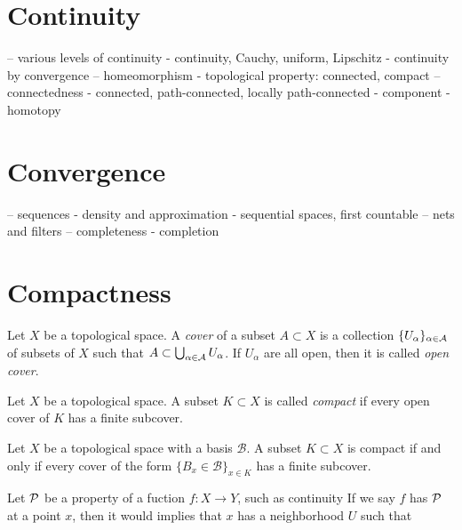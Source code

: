 \documentclass{../crs}
\begin{document}
\chapter{Continuity}
-- various levels of continuity
- continuity, Cauchy, uniform, Lipschitz
- continuity by convergence
-- homeomorphism
- topological property: connected, compact
-- connectedness
- connected, path-connected, locally path-connected
- component
- homotopy













\chapter{Convergence}
-- sequences
- density and approximation
- sequential spaces, first countable
-- nets and filters
-- completeness
- completion















\chapter{Compactness}
\begin{defn}
Let $X$ be a topological space.
A \emph{cover} of a subset $A\subset X$ is a collection $\{U_\alpha\}_{\alpha\in\mathcal{A}}$ of subsets of $X$ such that $A\subset\bigcup_{\alpha\in\mathcal{A}}U_\alpha$.
If $U_\alpha$ are all open, then it is called \emph{open cover}.
\end{defn}
\begin{defn}
Let $X$ be a topological space.
A subset $K\subset X$ is called \emph{compact} if every open cover of $K$ has a finite subcover.
\end{defn}
\begin{prop}
Let $X$ be a topological space with a basis $\mathcal{B}$.
A subset $K\subset X$ is compact if and only if every cover of the form $\{B_x\in\mathcal{B}\}_{x\in K}$ has a finite subcover.
\end{prop}
\begin{rmk}
Let $\mathcal{P}$ be a property of a fuction $f\colon X\to Y$, such as continuity
If we say $f$ has $\mathcal{P}$ at a point $x$, then it would implies that $x$ has a neighborhood $U$ such that 
\end{rmk}
\end{document}
